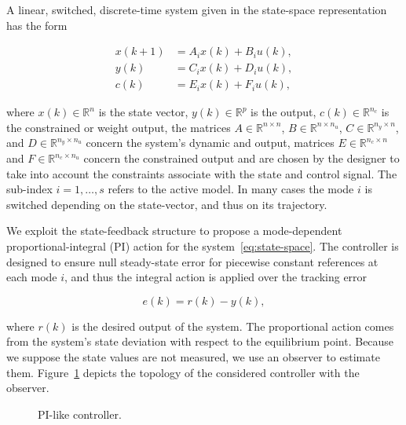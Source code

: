 A linear, switched, discrete-time system given in the state-space representation
has the form

\begin{equation}
  \label{eq:state-space}
  \begin{aligned}
    x(k+1) & = A_{i}x(k)+B_{i}u(k), \\
    y(k)   & = C_{i}x(k)+D_{i}u(k), \\
    c(k)   & = E_{i}x(k)+F_{i}u(k),
  \end{aligned}
\end{equation}

where \(x(k)\in\mathbb{R}^n\) is the state vector, \(y(k)\in\mathbb{R}^p\) is the
output, \(c(k)\in\mathbb{R}^{n_c}\) is the constrained or weight output, the
matrices \(A\in\mathbb{R}^{n\times{}n}\), \(B\in\mathbb{R}^{n\times{}n_u}\),
\(C\in\mathbb{R}^{n_y\times{}n}\), and \(D\in\mathbb{R}^{n_y\times{}n_u}\) concern the
system's dynamic and output, matrices \(E\in\mathbb{R}^{n_c\times{}n}\) and
\(F\in\mathbb{R}^{n_c\times{}n_u}\) concern the constrained output and are chosen by
the designer to take into account the constraints associate with the state and
control signal. The sub-index \(i = 1,\ldots, s\) refers to the active model. In many
cases the mode \(i\) is switched depending on the state-vector, and thus on its
trajectory.

We exploit the state-feedback structure to propose a mode-dependent
proportional-integral (PI) action for the system~\eqref{eq:state-space}. The
controller is designed to ensure null steady-state error for piecewise constant
references at each mode \(i\), and thus the integral action is applied over the
tracking error~\parencite{lopes.leite.ea:anti-windup}

\begin{equation}
  \label{eq:r-y-error}
  e(k) = r(k)-y(k),
\end{equation}

where \(r(k)\) is the desired output of the system. The proportional action
comes from the system's state deviation with respect to the equilibrium point.
Because we suppose the state values are not measured, we use an observer to
estimate them. Figure~\ref{fig:pi-controller-diagram} depicts the topology of
the considered controller with the observer.

\begin{figure}[!htb]
  \centering
  \resizebox{0.98\linewidth}{!}{}
  \caption{PI-like controller.}%
  \label{fig:pi-controller-diagram}
\end{figure}

